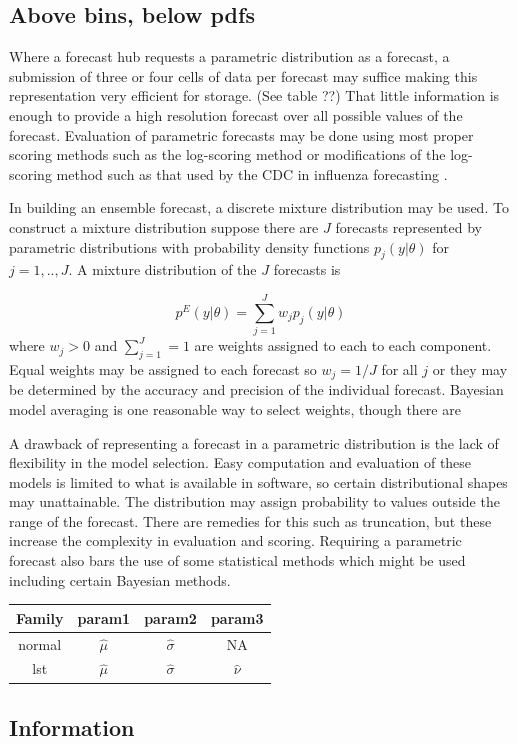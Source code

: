 \documentclass{article}\usepackage[]{graphicx}\usepackage[]{color}
\begin{document}
\subsection*{Above bins, below pdfs}


Where a forecast hub requests a parametric distribution as a forecast, a 
submission of three or four cells of data per forecast may suffice making this
representation very efficient for storage. (See table ??)
That little information is enough to provide a high resolution forecast over
all possible values of the forecast. Evaluation of parametric forecasts may be 
done using most proper scoring methods such as the log-scoring method
\cite{gneiting2007strictly}
or modifications of the log-scoring method such as that used by the CDC in 
influenza forecasting \cite{reich2019collaborative}.

In building an ensemble forecast, a discrete mixture distribution may be used.  
To construct a mixture distribution suppose there are $J$ forecasts represented
by parametric distributions with probability density functions $p_j(y|\theta)$ 
for $j = 1,..,J$. A mixture distribution of the $J$ forecasts is 

$$p^{E}(y|\theta) = \sum_{j=1}^{J} w_j p_j(y|\theta)$$
where $w_j > 0$ and $\sum_{j=1}^{J} = 1$ are weights assigned to each to each 
component. Equal weights may be assigned to each forecast so $w_j = 1/J$ for all
$j$ or they may be determined by the accuracy and precision of the individual
forecast. Bayesian model averaging \cite{raftery2005using}
is one reasonable way to select weights, though there are 

A drawback of representing a forecast in a parametric distribution is the lack 
of flexibility in the model selection. Easy computation and evaluation of these 
models is limited to what is available in software, so certain distributional
shapes may unattainable. The distribution may assign probability to values
outside the range of the forecast. There are remedies for this such as 
truncation, but these increase the complexity in evaluation and scoring.
Requiring a parametric forecast also bars the use of some statistical methods
which might be used including certain Bayesian methods.

\begin{table}[h!]
\centering
 \begin{tabular}{||c c c c||} 
 \hline
 Family & param1 & param2 & param3 \\ [0.5ex] 
 \hline\hline
 normal & $\hat{\mu}$ & $\hat{\sigma}$ & NA \\ 
 lst & $\hat{\mu}$ & $\hat{\sigma}$ & $\hat{\nu}$ \\ [1ex] 
 \hline
 \end{tabular}
\end{table}

 



\subsection*{Information}
	 

	 

\newpage    


\end{document}
